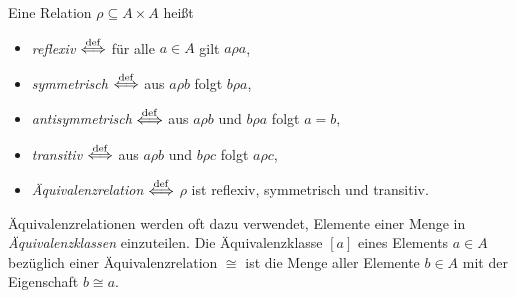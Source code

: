 \begin{definition}\label{def:relations}
 Eine Relation $\rho \subseteq A\times A$ heißt
  \begin{itemize}
  \item \emph{reflexiv}  $\stackrel{\rm def}{\Longleftrightarrow}$ für alle $a\in A$ gilt $a\rho
    a$, 
  \item \emph{symmetrisch}  $\stackrel{\rm def}{\Longleftrightarrow}$ aus $a\rho b$ folgt
    $b\rho a$,
  \item \emph{antisymmetrisch}  $\stackrel{\rm def}{\Longleftrightarrow}$ aus $a\rho b$ und
    $b\rho a$ folgt $a=b$,
  \item \emph{transitiv}  $\stackrel{\rm def}{\Longleftrightarrow}$ aus $a\rho b$ und
    $b\rho c$ folgt $a\rho c$,
  \item \emph{Äquivalenzrelation}  $\stackrel{\rm def}{\Longleftrightarrow}$ $\rho$ ist 
    reflexiv, symmetrisch und transitiv.
  \end{itemize}
\end{definition}
%
Äquivalenzrelationen werden oft dazu verwendet, Elemente einer Menge
in \emph{Äquivalenzklassen} einzuteilen.  Die Äquivalenzklasse $[a]$ eines
Elements $a\in A$ bezüglich einer Äquivalenzrelation $\cong$ ist die
Menge aller Elemente $b\in A$ mit der Eigenschaft $b\cong a$.

